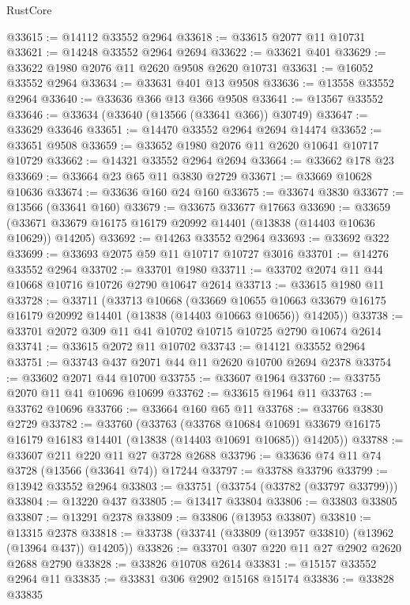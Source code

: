 \begin{lexlean}{RustCore}
\begin{coremodule}
@33615 := @14112 @33552 @2964
@33618 := @33615 @2077 @11 @10731
@33621 := @14248 @33552 @2964 @2694
@33622 := @33621 @401
@33629 := @33622 @1980 @2076 @11 @2620 @9508 @2620 @10731
@33631 := @16052 @33552 @2964
@33634 := @33631 @401 @13 @9508
@33636 := @13558 @33552 @2964
@33640 := @33636 @366 @13 @366 @9508
@33641 := @13567 @33552
@33646 := @33634 (@33640 (@13566 (@33641 @366)) @30749)
@33647 := @33629 @33646
@33651 := @14470 @33552 @2964 @2694 @14474
@33652 := @33651 @9508
@33659 := @33652 @1980 @2076 @11 @2620 @10641 @10717 @10729
@33662 := @14321 @33552 @2964 @2694
@33664 := @33662 @178 @23
@33669 := @33664 @23 @65 @11 @3830 @2729
@33671 := @33669 @10628 @10636
@33674 := @33636 @160 @24 @160
@33675 := @33674 @3830
@33677 := @13566 (@33641 @160)
@33679 := @33675 @33677 @17663
@33690 := @33659 (@33671 @33679 @16175 @16179 @20992 @14401 (@13838 (@14403 @10636 @10629)) @14205)
@33692 := @14263 @33552 @2964
@33693 := @33692 @322
@33699 := @33693 @2075 @59 @11 @10717 @10727 @3016
@33701 := @14276 @33552 @2964
@33702 := @33701 @1980
@33711 := @33702 @2074 @11 @44 @10668 @10716 @10726 @2790 @10647 @2614
@33713 := @33615 @1980 @11
@33728 := @33711
    (@33713
      @10668
      (@33669
        @10655
        @10663
        @33679
        @16175
        @16179
        @20992
        @14401
        (@13838 (@14403 @10663 @10656))
        @14205))
@33738 := @33701 @2072 @309 @11 @41 @10702 @10715 @10725 @2790 @10674 @2614
@33741 := @33615 @2072 @11 @10702
@33743 := @14121 @33552 @2964
@33751 := @33743 @437 @2071 @44 @11 @2620 @10700 @2694 @2378
@33754 := @33602 @2071 @44 @10700
@33755 := @33607 @1964
@33760 := @33755 @2070 @11 @41 @10696 @10699
@33762 := @33615 @1964 @11
@33763 := @33762 @10696
@33766 := @33664 @160 @65 @11
@33768 := @33766 @3830 @2729
@33782 := @33760
    (@33763
      (@33768
        @10684
        @10691
        @33679
        @16175
        @16179
        @16183
        @14401
        (@13838 (@14403 @10691 @10685))
        @14205))
@33788 := @33607 @211 @220 @11 @27 @3728 @2688
@33796 := @33636 @74 @11 @74 @3728 (@13566 (@33641 @74)) @17244
@33797 := @33788 @33796
@33799 := @13942 @33552 @2964
@33803 := @33751 (@33754 (@33782 (@33797 @33799)))
@33804 := @13220 @437
@33805 := @13417 @33804
@33806 := @33803 @33805
@33807 := @13291 @2378
@33809 := @33806 (@13953 @33807)
@33810 := @13315 @2378
@33818 := @33738 (@33741 (@33809 (@13957 @33810) (@13962 (@13964 @437)) @14205))
@33826 := @33701 @307 @220 @11 @27 @2902 @2620 @2688 @2790
@33828 := @33826 @10708 @2614
@33831 := @15157 @33552 @2964 @11
@33835 := @33831 @306 @2902 @15168 @15174
@33836 := @33828 @33835

\end{coremodule}
\end{lexlean}
